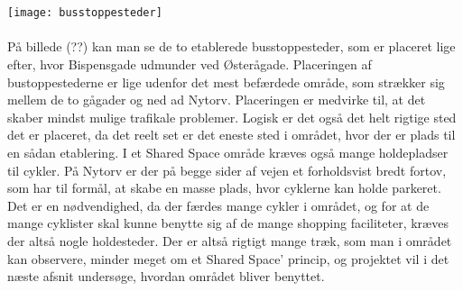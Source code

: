 \\\\
\texttt{[image: busstoppesteder]}
\\\\
På billede (??) kan man se de to etablerede busstoppesteder, som er placeret lige efter, hvor Bispensgade udmunder ved Østerågade. Placeringen af bustoppestederne er lige udenfor det mest befærdede område, som strækker sig mellem de to gågader og ned ad Nytorv. Placeringen er medvirke til, at det skaber mindst mulige trafikale problemer. Logisk er det også det helt rigtige sted det er placeret, da det reelt set er det eneste sted i området, hvor der er plads til en sådan etablering. 
I et Shared Space område kræves også mange holdepladser til cykler. På Nytorv er der på begge sider af vejen et forholdsvist bredt fortov, som har til formål, at skabe en masse plads, hvor cyklerne kan holde parkeret. Det er en nødvendighed, da der færdes mange cykler i området, og for at de mange cyklister skal kunne benytte sig af de mange shopping faciliteter, kræves der altså nogle holdesteder. 
Der er altså rigtigt mange træk, som man i området kan observere, minder meget om et Shared Space’ princip, og projektet vil i det næste afsnit undersøge, hvordan området bliver benyttet. 
\\\\
\\\\
